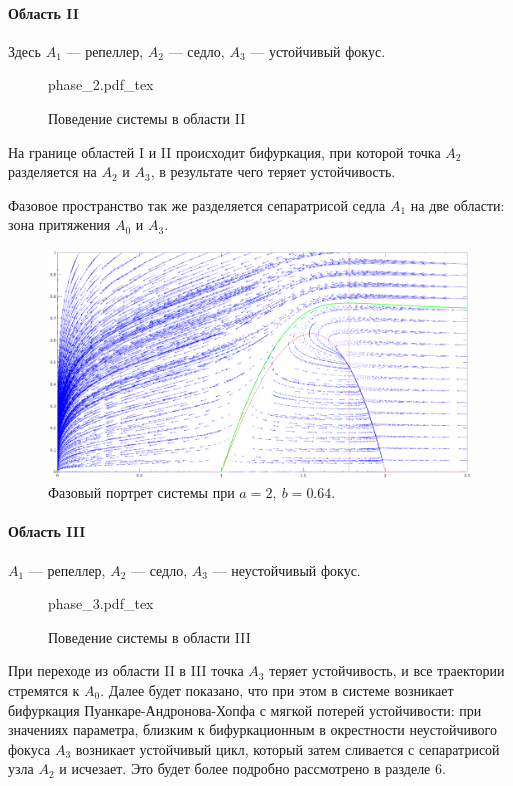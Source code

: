 \documentclass[16pt]{article}
\newcommand{\incfig}[2]{%
    \def\svgwidth{#2 mm}
    {#1.pdf_tex}
}
\newcommand\Pict[3]{
\begin{figure}[h!]
    \centering
    \incfig{#1}{#3}
    \caption{#2}
    \label{fig:#1}
\end{figure}
}
\begin{document}
\paragraph{Область II} Здесь $A_1$ --- репеллер, $A_2$ --- седло, $A_3$ --- устойчивый фокус.
\Pict{phase_2}{Поведение системы в области II}{70}

На границе областей I и II происходит бифуркация, при которой точка $A_2$ разделяется на $A_2$ и $A_3$, в результате 
чего теряет устойчивость. 

Фазовое пространство так же разделяется сепаратрисой седла $A_1$ на две области: зона притяжения $A_0$ и $A_3$.



\begin{figure}[h]
\begin{center}
\includegraphics[width=160mm]{ph2.eps}
\caption{Фазовый портрет системы при $a = 2, \ b = 0.64$.}
\end{center}
\end{figure}

\newpage
\paragraph{Область III} $A_1$ --- репеллер, $A_2$  --- седло, $A_3$ --- неустойчивый фокус.
\Pict{phase_3}{Поведение системы в области III}{70}

При переходе из области II в III точка $A_3$ теряет устойчивость, и все траектории стремятся к $A_0$.
Далее будет показано, что при этом в системе возникает бифуркация Пуанкаре-Андронова-Хопфа с мягкой потерей
устойчивости: при значениях параметра, близким к бифуркационным в окрестности неустойчивого фокуса $A_3$ возникает
устойчивый цикл, который затем сливается с сепаратрисой узла $A_2$ и исчезает. Это будет более подробно рассмотрено
в разделе 6.
\end{document}
